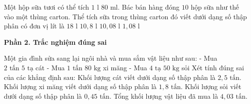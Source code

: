 \begin{ex} %
Một hộp sữa tươi có thể tích $1\text{ l } 80\text{ ml}$. Bác bán hàng đóng $10$ hộp sữa như thế vào một thùng carton. Thể tích sữa trong thùng carton đó viết dưới dạng số thập phân có đơn vị lít là
\choice
{$18\text{ l}$}
{\True $10{,}8\text{ l}$}
{$10{,}08\text{ l}$}
{$1{,}08\text{ l}$}
\end{ex}

\textbf{Phần 2. Trắc nghiệm đúng sai}

\begin{ex} %
Một gia đình sửa sang lại ngôi nhà và mua sắm vật liệu như sau:
- Mua $2\text{ tấn } 5\text{ tạ}$ cát
- Mua $1\text{ tấn } 80\text{ kg}$ xi măng
- Mua $4\text{ tạ } 50\text{ kg}$ sỏi
Xét tính đúng sai của các khẳng định sau:
\choiceTF
{\True Khối lượng cát viết dưới dạng số thập phân là $2{,}5\text{ tấn}$.}
{Khối lượng xi măng viết dưới dạng số thập phân là $1{,}8\text{ tấn}$.}
{\True Khối lượng sỏi viết dưới dạng số thập phân là $0{,}45\text{ tấn}$.}
{\True Tổng khối lượng vật liệu đã mua là $4{,}03\text{ tấn}$.}
\end{ex}

